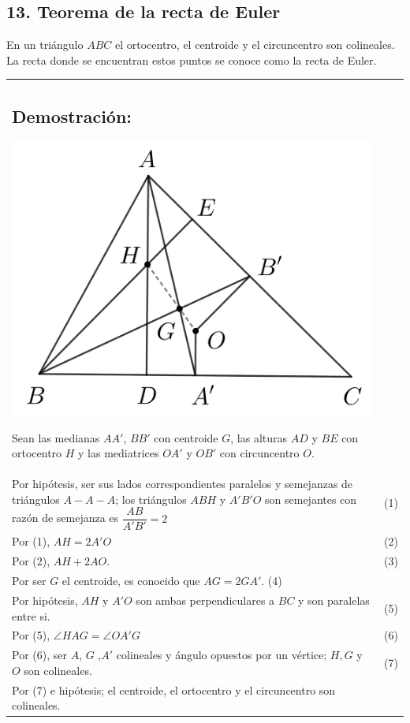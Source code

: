 \documentclass[12pt,a4paper]{article}
\begin{document}
\subsection*{13. Teorema de la recta de Euler}
En un triángulo $ABC$ el ortocentro, el centroide y el circuncentro son colineales. La recta donde se encuentran estos puntos se conoce como la recta de Euler.\\
\begin{tabular}{p{15.9 cm} p{1cm}}
\subsection*{Demostración:}
\begin{center}
\includegraphics[scale=0.7]{recta_euler.png} 
\end{center}
Sean las medianas $AA'$, $BB'$ con centroide $G$, las alturas $AD$ y $BE$ con ortocentro $H$ y las mediatrices $OA'$ y $OB'$ con circuncentro $O$.
\\Por hipótesis, ser sus lados correspondientes  paralelos y semejanzas de triángulos $A-A-A$; los triángulos $ABH$ y $A'B'O$ son semejantes con razón de semejanza es $\dfrac{AB}{A'B'}=2$ &(1)
\\Por (1), $AH=2A'O$ &(2)
\\Por (2), $AH+2AO$. &(3)
\\Por ser $G$ el centroide, es conocido que $AG= 2GA'$. (4)
\\Por hipótesis, $AH$ y $A'O$ son ambas perpendiculares a $BC$ y son paralelas entre si. & (5)
\\Por (5), $\angle HAG= \angle OA'G$ &(6)
\\Por (6), ser $A$, $G$ ,$A'$ colineales y ángulo opuestos por un vértice; $H, G$ y $O$ son colineales. &(7)
\\Por (7) e hipótesis; el centroide, el ortocentro y el circuncentro son colineales.
\end{tabular}
\end{document}
